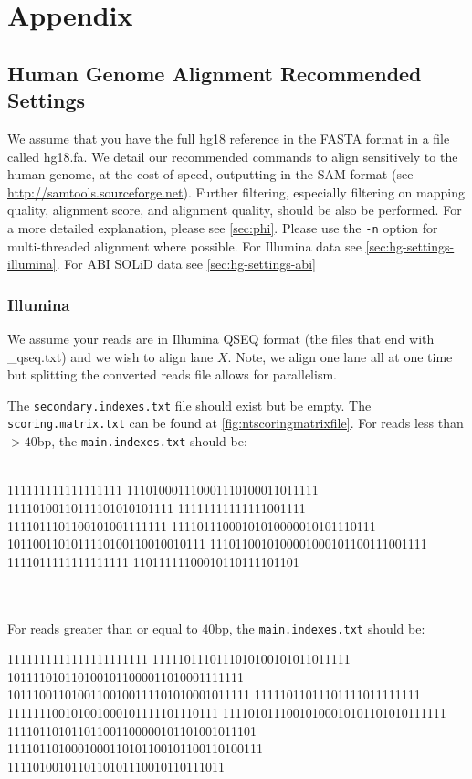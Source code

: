 \documentclass[a4paper,12pt]{book}
\begin{document}
\chapter{Appendix}
\section{Human Genome Alignment Recommended Settings}
\label{sec:hg-settings}
We assume that you have the full hg18 reference in the FASTA format in a file called hg18.fa.
We detail our recommended commands to align sensitively to the human genome, at the cost of speed, outputting in the SAM format (see \url{http://samtools.sourceforge.net}).
Further filtering, especially filtering on mapping quality, alignment score, and alignment quality, should be also be performed.
For a more detailed explanation, please see \autoref{sec:phi}.
Please use the {\tt -n} option for multi-threaded alignment where possible.
For Illumina data see \autoref{sec:hg-settings-illumina}. 
For ABI SOLiD data see \autoref{sec:hg-settings-abi}

\subsection{Illumina}
\label{sec:hg-settings-illumina}
We assume your reads are in Illumina QSEQ format (the files that end with \_qseq.txt) and we wish to align lane $X$.
Note, we align one lane all at one time but splitting the converted reads file allows for parallelism.

The {\tt secondary.indexes.txt} file should exist but be empty.
The {\tt scoring.matrix.txt} can be found at \autoref{fig:ntscoringmatrixfile}. 
For reads less than $>40$bp, the {\tt main.indexes.txt} should be:\\
\\
\begin{boxedverbatim}
111111111111111111
111010001110001110100011011111
11110100110111101010101111
11111111111111001111
1111011101100101001111111
11110111000101010000010101110111
1011001101011110100110010010111
1110110010100001000101100111001111
1111011111111111111
11011111100010110111101101
\end{boxedverbatim}
\\
\\
For reads greater than or equal to $40$bp, the {\tt main.indexes.txt} should be:\\
\begin{boxedverbatim}
1111111111111111111111
1111101110111010100101011011111
1011110101101001011000011010001111111
10111001101001100100111101010001011111
11111011011101111011111111
111111100101001000101111101110111
11110101110010100010101101010111111
111101101011011001100000101101001011101
1111011010001000110101100101100110100111
1111010010110110101110010110111011
\end{boxedverbatim}
\\
\end{document}
